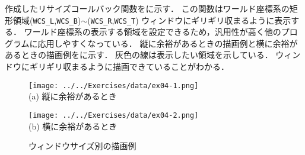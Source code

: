 

\vspace{\baselineskip}


作成したリサイズコールバック関数をに示す．
この関数はワールド座標系の矩形領域(\texttt{WCS\_L},\texttt{WCS\_B})$\sim$(\texttt{WCS\_R},\texttt{WCS\_T})
ウィンドウにギリギリ収まるように表示する．
ワールド座標系の表示する領域を設定できるため，汎用性が高く他のプログラムに応用しやすくなっている．
縦に余裕があるときの描画例と横に余裕があるときの描画例をに示す．
灰色の線は表示したい領域を示している．
ウィンドウにギリギリ収まるように描画できていることがわかる．



\begin{figure}[htbp]
	\centering
	\begin{minipage}[b]{0.4\textwidth}
		\centering
		\texttt{[image: ../../Exercises/data/ex04-1.png]}\\
		{\small (a) \; 縦に余裕があるとき}
	\end{minipage}
	\begin{minipage}[b]{0.5\textwidth}
		\centering
		\texttt{[image: ../../Exercises/data/ex04-2.png]}\\
		{\small (b) \; 横に余裕があるとき}
	\end{minipage}
	\label{fig:ex04}
	\caption{ウィンドウサイズ別の描画例}
\end{figure}
